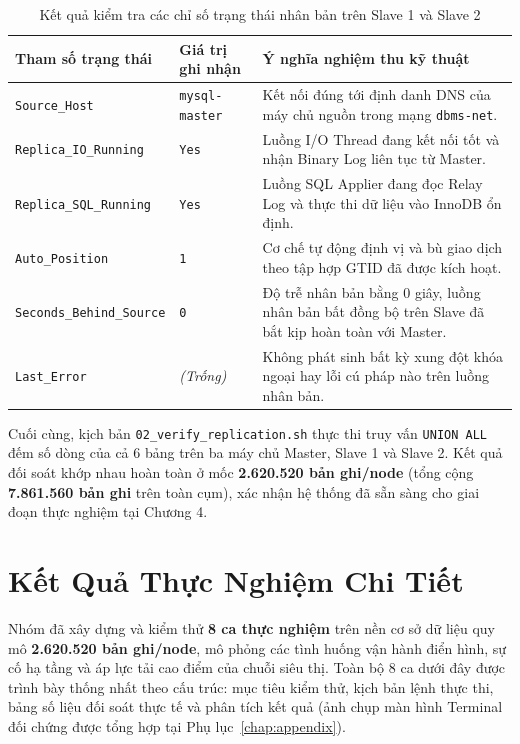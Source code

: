 \documentclass[12pt,a4paper]{report}
\begin{document}
\begin{table}[H]
\centering
\footnotesize
\caption{Kết quả kiểm tra các chỉ số trạng thái nhân bản trên Slave 1 và Slave 2}
\label{tab:verify_replica_status}
\vspace{0.15cm}
\begin{tabularx}{\textwidth}{L{4.2cm} L{3.5cm} Y}
\toprule
\textbf{Tham số trạng thái} & \textbf{Giá trị ghi nhận} & \textbf{Ý nghĩa nghiệm thu kỹ thuật} \\
\midrule
\texttt{Source\_Host} & \texttt{mysql-master} & Kết nối đúng tới định danh DNS của máy chủ nguồn trong mạng \texttt{dbms-net}. \\
\texttt{Replica\_IO\_Running} & \texttt{Yes} & Luồng I/O Thread đang kết nối tốt và nhận Binary Log liên tục từ Master. \\
\texttt{Replica\_SQL\_Running} & \texttt{Yes} & Luồng SQL Applier đang đọc Relay Log và thực thi dữ liệu vào InnoDB ổn định. \\
\texttt{Auto\_Position} & \texttt{1} & Cơ chế tự động định vị và bù giao dịch theo tập hợp GTID đã được kích hoạt. \\
\texttt{Seconds\_Behind\_Source} & \texttt{0} & Độ trễ nhân bản bằng 0 giây, luồng nhân bản bất đồng bộ trên Slave đã bắt kịp hoàn toàn với Master. \\
\texttt{Last\_Error} & \textit{(Trống)} & Không phát sinh bất kỳ xung đột khóa ngoại hay lỗi cú pháp nào trên luồng nhân bản. \\
\bottomrule
\end{tabularx}
\end{table}

Cuối cùng, kịch bản \texttt{02\_verify\_replication.sh} thực thi truy vấn \texttt{UNION ALL} đếm số dòng của cả 6 bảng trên ba máy chủ Master, Slave 1 và Slave 2. Kết quả đối soát khớp nhau hoàn toàn ở mốc \textbf{2.620.520 bản ghi/node} (tổng cộng \textbf{7.861.560 bản ghi} trên toàn cụm), xác nhận hệ thống đã sẵn sàng cho giai đoạn thực nghiệm tại Chương 4.

\chapter{Kết Quả Thực Nghiệm Chi Tiết}

Nhóm đã xây dựng và kiểm thử \textbf{8 ca thực nghiệm} trên nền cơ sở dữ liệu quy mô \textbf{2.620.520 bản ghi/node}, mô phỏng các tình huống vận hành điển hình, sự cố hạ tầng và áp lực tải cao điểm của chuỗi siêu thị. Toàn bộ 8 ca dưới đây được trình bày thống nhất theo cấu trúc: mục tiêu kiểm thử, kịch bản lệnh thực thi, bảng số liệu đối soát thực tế và phân tích kết quả (ảnh chụp màn hình Terminal đối chứng được tổng hợp tại Phụ lục~\ref{chap:appendix}).
\end{document}
